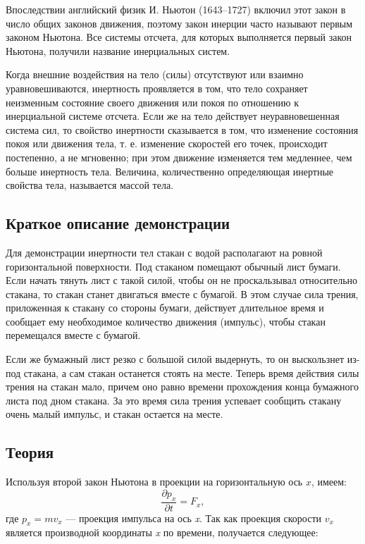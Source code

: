 \documentclass[../../../All.tex]{subfiles}
\begin{document}
Впоследствии английский физик И. Ньютон (1643–1727) включил этот закон в число общих законов движения, поэтому закон инерции часто называют первым законом Ньютона. 
Все системы отсчета, для которых выполняется первый закон 
Ньютона, получили название инерциальных систем. 

Когда внешние воздействия на тело (силы) отсутствуют или взаимно уравновешиваются, инертность проявляется в том, что тело сохраняет неизменным состояние своего движения или покоя по отношению к инерциальной системе отсчета.
Если же на тело действует неуравновешенная система сил, то свойство инертности сказывается в том, что изменение состояния покоя или движения тела, т. е. изменение скоростей его точек, происходит постепенно, а не мгновенно; при этом движение изменяется тем медленнее, чем больше инертность тела.
Величина, количественно определяющая инертные свойства 
тела, называется массой тела. 

\subsection*{\textcolor{PineGreen}{Краткое описание демонстрации}}

Для демонстрации инертности тел стакан с водой располагают на ровной горизонтальной поверхности.
Под стаканом помещают обычный лист бумаги.
Если начать тянуть лист с такой силой, чтобы он не проскальзывал относительно стакана, то стакан станет двигаться вместе с бумагой.
В этом случае сила трения, приложенная к стакану со стороны бумаги, действует длительное время и сообщает ему  необходимое количество движения (импульс), чтобы стакан перемещался вместе с бумагой. 

Если же бумажный лист резко с большой силой выдернуть, то он выскользнет из-под стакана, 
а сам стакан останется стоять на месте. 
Теперь время действия силы трения на стакан мало, причем оно равно времени прохождения конца 
бумажного листа под дном стакана.
За это время сила трения успевает сообщить стакану очень малый импульс, и стакан остается 
на месте. 

\subsection*{\textcolor{PineGreen}{Теория}}

Используя второй закон Ньютона в проекции на горизонтальную ось $ x $, имеем:
\begin{equation}\label{inertia-eq1}
\frac{\partial p_{x}}{\partial t} = F_{x},
\end{equation}
где $ p_{x}=mv_{x} $ — проекция импульса на ось \textit{x}.
Так как проекция скорости $v_{x}$ является производной координаты \textit{x} по времени, получается следующее:
 
\end{document}
